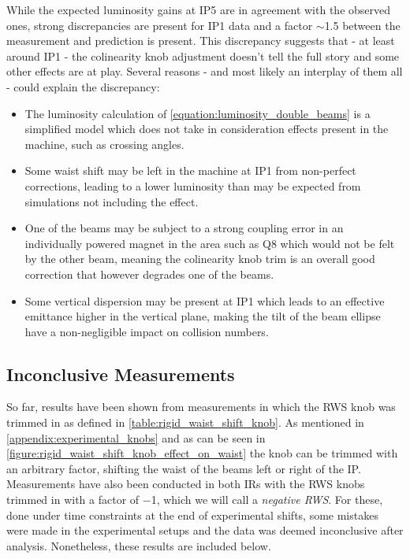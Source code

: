 While the expected luminosity gains at IP\num{5} are in agreement with the observed ones, strong discrepancies are present for IP\num{1} data and a factor \(\sim\)\num{1.5} between the measurement and prediction is present.
This discrepancy suggests that - at least around IP\num{1} - the colinearity knob adjustment doesn't tell the full story and some other effects are at play.
Several reasons - and most likely an interplay of them all - could explain the discrepancy:
\begin{itemize}
    \item The luminosity calculation of \cref{equation:luminosity_double_beams} is a simplified model which does not take in consideration effects present in the machine, such as crossing angles.
    \item Some waist shift may be left in the machine at IP\num{1} from non-perfect corrections, leading to a lower luminosity than may be expected from simulations not including the effect.
    \item One of the beams may be subject to a strong coupling error in an individually powered magnet in the area such as Q\num{8} which would not be felt by the other beam, meaning the colinearity knob trim is an overall good correction that however degrades one of the beams.
    \item Some vertical dispersion may be present at IP\num{1} which leads to an effective emittance higher in the vertical plane, making the tilt of the beam ellipse have a non-negligible impact on collision numbers.
\end{itemize}


\subsection{Inconclusive Measurements}
\label{subsection:rws_neg_measurements_garbage}

So far, results have been shown from measurements in which the RWS knob was trimmed in as defined in \cref{table:rigid_waist_shift_knob}.
As mentioned in \cref{appendix:experimental_knobs} and as can be seen in \cref{figure:rigid_waist_shift_knob_effect_on_waist} the knob can be trimmed with an arbitrary factor, shifting the waist of the beams left or right of the IP. 
Measurements have also been conducted in both IRs with the RWS knobs trimmed in with a factor of \num{-1}, which we will call a \textit{negative RWS}.
For these, done under time constraints at the end of experimental shifts, some mistakes were made in the experimental setups and the data was deemed inconclusive after analysis.
Nonetheless, these results are included below.

